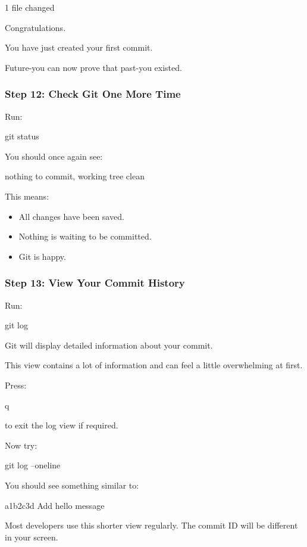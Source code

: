 \documentclass{csc2059practical}
\begin{document}
\begin{terminalplain}
1 file changed
\end{terminalplain}
Congratulations.

You have just created your first commit.

Future-you can now prove that past-you existed.

\subsubsection{Step 12: Check Git One More Time}
Run:

\begin{terminalplain}
git status
\end{terminalplain}
You should once again see:

\begin{terminalplain}
nothing to commit, working tree clean
\end{terminalplain}
This means:

\begin{itemize}
  \item All changes have been saved.
  \item Nothing is waiting to be committed.
  \item Git is happy.
\end{itemize}
\subsubsection{Step 13: View Your Commit History}
Run:

\begin{terminalplain}
git log
\end{terminalplain}
Git will display detailed information about your commit.

This view contains a lot of information and can feel a little overwhelming at first.

Press:

\begin{terminalplain}
q
\end{terminalplain}
to exit the log view if required.

Now try:

\begin{terminalplain}
git log --oneline
\end{terminalplain}
You should see something similar to:

\begin{terminalplain}
a1b2c3d Add hello message
\end{terminalplain}
Most developers use this shorter view regularly. The commit ID will be different in your screen.
\end{document}
